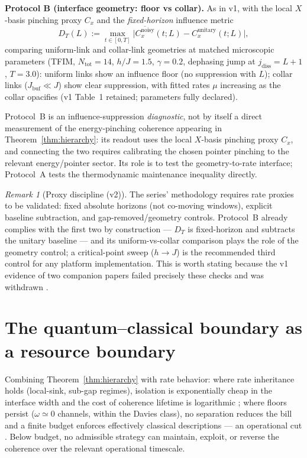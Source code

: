 \documentclass[11pt,a4paper]{article}
\theoremstyle{plain}
\theoremstyle{definition}
\theoremstyle{remark}
\newtheorem{remark}[theorem]{Remark}
\begin{document}
\textbf{Protocol B (interface geometry: floor vs collar).} As in v1, with
the local $X$-basis pinching proxy $C_x$ and the \emph{fixed-horizon}
influence metric
\begin{equation}
D_T(L) := \max_{t\in[0,T]}\big|\overline{C_x^{\mathrm{noisy}}}(t; L) -
C_x^{\mathrm{unitary}}(t; L)\big|,
\end{equation}
comparing uniform-link and collar-link geometries at matched microscopic
parameters (TFIM, $N_{\mathrm{tot}} = 14$, $h/J = 1.5$, $\gamma = 0.2$,
dephasing jump at $j_{\mathrm{diss}} = L+1$, $T = 3.0$): uniform links show
an influence floor (no suppression with $L$); collar links ($J_{\mathrm{buf}}
\ll J$) show clear suppression, with fitted rates $\mu$ increasing as the
collar opacifies (v1 Table~1 retained; parameters fully declared).

Protocol~B is an influence-suppression \emph{diagnostic}, not by itself a
direct measurement of the energy-pinching coherence appearing in
Theorem~\ref{thm:hierarchy}: its readout uses the local $X$-basis pinching
proxy $C_x$, and connecting the two requires calibrating the chosen pointer
pinching to the relevant energy/pointer sector. Its role is to test the
geometry-to-rate interface; Protocol~A tests the thermodynamic maintenance
inequality directly.

\begin{remark}[Proxy discipline (v2)]\label{rem:discipline}
The series' methodology \cite{HCut,Stress,RIP} requires rate proxies to be
validated: fixed absolute horizons (not co-moving windows), explicit
baseline subtraction, and gap-removed/geometry controls. Protocol~B already
complies with the first two by construction --- $D_T$ is fixed-horizon and
subtracts the unitary baseline --- and its uniform-vs-collar comparison
plays the role of the geometry control; a critical-point sweep ($h \to J$)
is the recommended third control for any platform implementation. This is
worth stating because the v1 evidence of two companion papers failed
precisely these checks and was withdrawn \cite{HCut,Stress}.
\end{remark}

\section{The quantum--classical boundary as a resource boundary}

Combining Theorem~\ref{thm:hierarchy} with rate behavior: where rate
inheritance holds (local-sink, sub-gap regimes), isolation is exponentially
cheap in the interface width and the cost of coherence lifetime is
logarithmic \cite{HCut}; where floors persist ($\omega \simeq 0$ channels,
within the Davies class), no separation reduces the bill and a finite budget
enforces effectively classical descriptions --- an operational cut
\cite{HCut,Closure}. Below budget, no admissible strategy can maintain,
exploit, or reverse the coherence over the relevant operational timescale.
\end{document}

